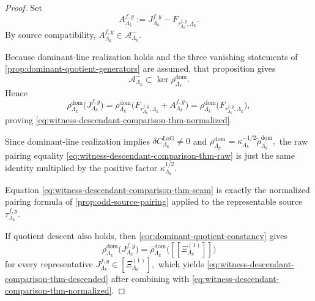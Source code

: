 \documentclass[11pt]{article}
\begin{document}
\begin{proof}
Set
\[
A^{f,y}_{\Lambda_k}
:=
J^{f,y}_{\Lambda_k}
-
F_{\tau^{f,y}_{\Lambda_k},\Lambda_k}.
\]
By source compatibility,
\(
A^{f,y}_{\Lambda_k}\in\mathcal A^-_{\Lambda_k}
\).

Because dominant-line realization holds and the three vanishing statements of
\cref{prop:dominant-quotient-generators} are assumed, that proposition gives
\[
\mathcal A^-_{\Lambda_k}\subset\ker\rho^{\mathrm{dom}}_{\Lambda_k}.
\]
Hence
\[
\rho^{\mathrm{dom}}_{\Lambda_k}\!\big(J^{f,y}_{\Lambda_k}\big)
=
\rho^{\mathrm{dom}}_{\Lambda_k}\!\big(
F_{\tau^{f,y}_{\Lambda_k},\Lambda_k}
+
A^{f,y}_{\Lambda_k}
\big)
=
\rho^{\mathrm{dom}}_{\Lambda_k}\!\big(F_{\tau^{f,y}_{\Lambda_k},\Lambda_k}\big),
\]
proving \eqref{eq:witness-descendant-comparison-thm-normalized}.

Since dominant-line realization implies
\(
\delta C^{\mathrm{LoG}}_{\Lambda_k}\neq 0
\)
and
\(
\rho^{\mathrm{dom}}_{\Lambda_k}
=
\kappa_{\Lambda_k}^{-1/2}\widetilde{\rho}^{\mathrm{dom}}_{\Lambda_k},
\)
the raw pairing equality \eqref{eq:witness-descendant-comparison-thm-raw} is just the same identity
multiplied by the positive factor \(\kappa_{\Lambda_k}^{1/2}\).

Equation \eqref{eq:witness-descendant-comparison-thm-seam} is exactly the normalized pairing formula
of \cref{prop:odd-source-pairing} applied to the representable source
\(
\tau^{f,y}_{\Lambda_k}
\).

If quotient descent also holds, then \cref{cor:dominant-quotient-constancy} gives
\[
\rho^{\mathrm{dom}}_{\Lambda_k}\!\big(J^{f,y}_{\Lambda_k}\big)
=
\overline{\rho}^{\mathrm{dom}}_{\Lambda_k}\big([\![\Xi^{(1)}_{\Lambda_k}]\!]\big)
\]
for every representative
\(
J^{f,y}_{\Lambda_k}\in[\Xi^{(1)}_{\Lambda_k}],
\)
which yields \eqref{eq:witness-descendant-comparison-thm-descended} after combining with
\eqref{eq:witness-descendant-comparison-thm-normalized}.
\end{proof}
\end{document}
